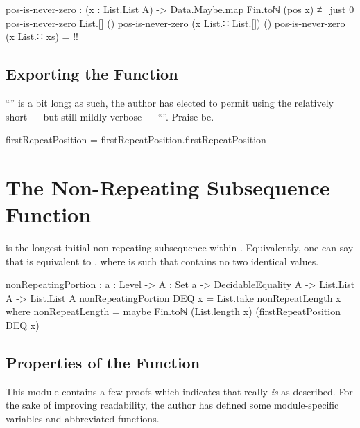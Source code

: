 \documentclass{report}
\begin{document}
\begin{code}
    pos-is-never-zero :
      (x : List.List A) ->
      Data.Maybe.map Fin.toℕ (pos x) ≢ just 0
    pos-is-never-zero List.[] ()
    pos-is-never-zero (x List.∷ List.[]) ()
    pos-is-never-zero (x List.∷ xs) = {!!}
\end{code}

\subsection{Exporting the Function}
``'' is a bit long; as such, the author has elected to permit using the relatively short --- but still mildly verbose --- ``''.  Praise be.

\begin{code}
firstRepeatPosition = firstRepeatPosition.firstRepeatPosition
\end{code}

\section{The Non-Repeating Subsequence Function}
   is the longest initial non-repeating subsequence within .  Equivalently, one can say that    is equivalent to   , where  is such that    contains no two identical values.

\begin{code}
nonRepeatingPortion : {a : Level} ->
                      {A : Set a} ->
                      DecidableEquality A ->
                      List.List A ->
                      List.List A
nonRepeatingPortion DEQ x = List.take nonRepeatLength x
  where nonRepeatLength = maybe Fin.toℕ (List.length x) (firstRepeatPosition DEQ x)
\end{code}

\subsection{Properties of the Function}
This module contains a few proofs which indicates that  really \emph{is} as described.  For the sake of improving readability, the author has defined some module-specific variables and abbreviated functions.
\end{document}
